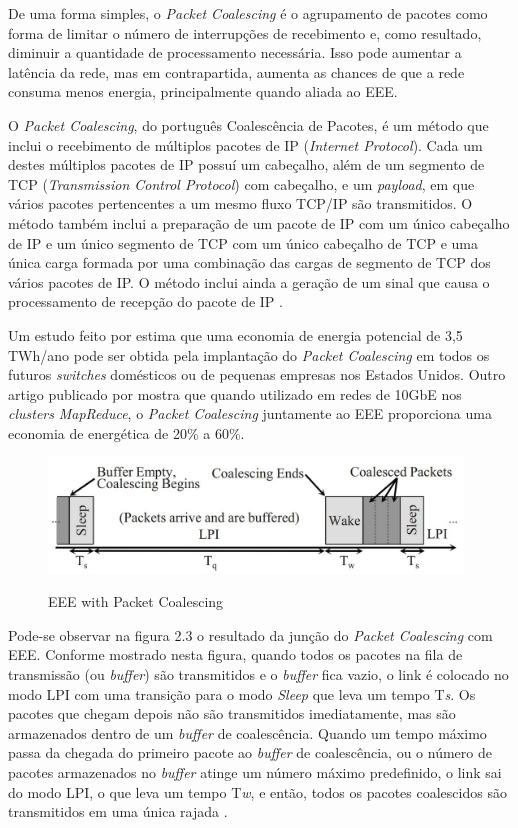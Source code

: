 De uma forma simples, o \emph{Packet Coalescing} é o agrupamento de pacotes como forma de limitar o número de interrupções de recebimento e, como resultado, diminuir a quantidade de processamento necessária. Isso pode aumentar a latência da rede, mas em contrapartida, aumenta as chances de que a rede consuma menos energia, principalmente quando aliada ao EEE.

O \emph{Packet Coalescing}, do português Coalescência de Pacotes, é um método que inclui o recebimento de múltiplos pacotes de IP (\emph{Internet Protocol}). Cada um destes múltiplos pacotes de IP possuí um cabeçalho, além de um segmento de TCP (\emph{Transmission Control Protocol}) com cabeçalho, e um \emph{payload}, em que vários pacotes pertencentes a um mesmo fluxo TCP/IP são transmitidos. O método também inclui a preparação de um pacote de IP com um único cabeçalho de IP e um único segmento de TCP com um único cabeçalho de TCP e uma única carga formada por uma combinação das cargas de segmento de TCP dos vários pacotes de IP. O método inclui ainda a geração de um sinal que causa o processamento de recepção do pacote de IP \cite{makineni2020packet}.

Um estudo feito por \cite{mostowfi2011saving} estima que uma economia de energia potencial de 3,5 TWh/ano pode ser obtida pela implantação do \emph{Packet Coalescing} em todos os futuros \emph{switches} domésticos ou de pequenas empresas nos Estados Unidos. Outro artigo publicado por \cite{e2017energy} mostra que quando utilizado em redes de 10GbE nos \emph{clusters} \emph{MapReduce}, o \emph{Packet Coalescing} juntamente ao EEE proporciona uma economia de energética de 20\% a 60\%.

\begin{figure}[htp]
    \centering
    \includegraphics[width=11cm]{2-fundam/Figura_2.jpg}
    \caption{EEE with Packet Coalescing}
    \cite{mostowfi2011saving}
    \label{fig:EEEWithPacketCoalescing}
\end{figure}

Pode-se observar na figura 2.3 o resultado da junção do \emph{Packet Coalescing} com EEE. Conforme mostrado nesta figura, quando todos os pacotes na fila de transmissão (ou \emph{buffer}) são transmitidos e o \emph{buffer} fica vazio, o link é colocado no modo LPI com uma transição para o modo \emph{Sleep} que leva um tempo T\textit{s}. Os pacotes que chegam depois não são transmitidos imediatamente, mas são armazenados dentro de um \emph{buffer} de coalescência. Quando um tempo máximo passa da chegada do primeiro pacote ao \emph{buffer} de coalescência, ou o número de pacotes armazenados no \emph{buffer} atinge um número máximo predefinido, o link sai do modo LPI, o que leva um tempo T\textit{w}, e então, todos os pacotes coalescidos são transmitidos em uma única rajada \cite{mostowfi2011saving}.

